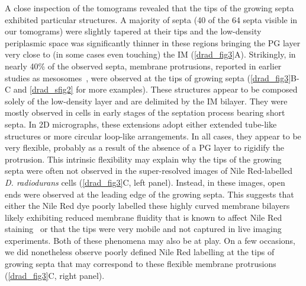 A close inspection of the tomograms revealed that the tips of the growing septa exhibited particular structures.
A majority of septa (40 of the 64 septa visible in our tomograms) were slightly tapered at their tips and the low-density periplasmic space was significantly thinner in these regions bringing the PG layer very close to (in some cases even touching) the IM (\autoref{drad_fig3}A).
Strikingly, in nearly 40\% of the observed septa, membrane protrusions, reported in earlier studies as mesosomes~\cite{thornleyFineStructureMicrococcus1965,sleytrStudyFreezeetchingFine1973}, were observed at the tips of growing septa (\autoref{drad_fig3}B-C and \autoref{drad_sfig2} for more examples).
These structures appear to be composed solely of the low-density layer and are delimited by the IM bilayer.
They were mostly observed in cells in early stages of the septation process bearing short septa.
In 2D micrographs, these extensions adopt either extended tube-like structures or more circular loop-like arrangements.
In all cases, they appear to be very flexible, probably as a result of the absence of a PG layer to rigidify the protrusion.
This intrinsic flexibility may explain why the tips of the growing septa were often not observed in the super-resolved images of Nile Red-labelled \textit{D. radiodurans} cells (\autoref{drad_fig3}C, left panel).
Instead, in these images, open ends were observed at the leading edge of the growing septa.
This suggests that either the Nile Red dye poorly labelled these highly curved membrane bilayers likely exhibiting reduced membrane fluidity that is known to affect Nile Red staining~\cite{strahlActinHomologueMreB2014} or that the tips were very mobile and not captured in live imaging experiments.
Both of these phenomena may also be at play.
On a few occasions, we did nonetheless observe poorly defined Nile Red labelling at the tips of growing septa that may correspond to these flexible membrane protrusions (\autoref{drad_fig3}C, right panel).

